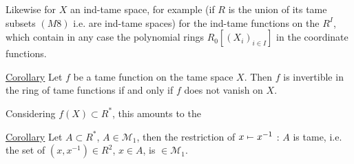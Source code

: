 Likewise for $X$ an ind-tame space, for example (if $R$ is the union  of its tame subsets $(M8)$ i.e.  are ind-tame spaces) for the ind-tame functions on the $R^I$, which contain in any case the  polynomial rings $R_0[(X_i)_{i\in I}]$ in the coordinate functions.


\uline{Corollary} Let $f$ be a tame function on the tame space $X$. Then $f$ is invertible in the ring of tame functions if and only if $f$ does not vanish on $X$.

Considering $f(X)\subset R^*$, this amounts to the

\uline{Corollary} Let $A\subset R^*$, $A\in\mathcal M_1$, then the restriction of $x\mathrel{\mapstochar\relbar}x^{-1}$ : $A$ is tame, i.e. the set of $(x,x^{-1})\in R^2$, $x\in A$, is $\in\mathcal M_1$.
